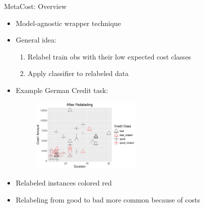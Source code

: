\documentclass[11pt,compress,t,notes=noshow, xcolor=table]{beamer}
\begin{document}
\begin{vbframe}{MetaCost: Overview}

        \begin{itemize}
            \item Model-agnostic wrapper technique                      
            \item General idea: 
                \begin{enumerate}
                \small
                    \item Relabel train obs with their low expected cost classes
                   
                    \item Apply classifier to relabeled data
                \end{enumerate} 
                \item Example German Credit task:
                                \begin{figure}[h]
            \centering
            \includegraphics[width=0.5\textwidth]{figure_man/relabeling_viz.pdf}
        \end{figure}
                \item Relabeled instances colored red\
                \item Relabeling from good to bad more common because of costs
        \end{itemize}

\end{vbframe}
\end{document}
